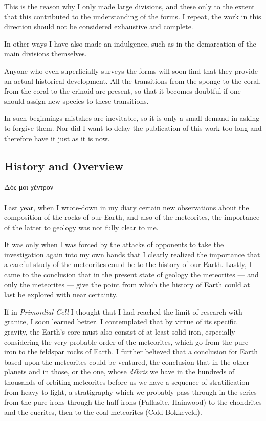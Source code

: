 \documentclass[a4paper, 12pt, oneside]{article}
\begin{document}
This is the reason why I only made large divisions, and these only to the extent that this contributed to the understanding of the forms. I repeat, the work in this direction should not be considered exhaustive and complete.

In other ways I have also made an indulgence, such as in the demarcation of the main divisions themselves.

Anyone who even superficially surveys the forms will soon find that they provide an actual historical development. All the transitions from the sponge to the coral, from the coral to the crinoid are present, so that it becomes doubtful if one should assign new species to these transitions.

In such beginnings mistakes are inevitable, so it is only a small demand in asking to forgive them. Nor did I want to delay the publication of this work too long and therefore have it just as it is now.
\clearpage
\subsection{History and Overview}
Δός μοι χέντρον%
\paragraph*{}
Last year, when I wrote-down in my diary certain new observations about the composition of the rocks of our Earth, and also of the meteorites, the importance of the latter to geology was not fully clear to me.

It was only when I was forced by the attacks of opponents to take the investigation again into my own hands that I clearly realized the importance that a careful study of the meteorites could be to the history of our Earth. Lastly, I came to the conclusion that in the present state of geology the meteorites --- and only the meteorites --- give the point from which the history of Earth could at last be explored with near certainty.

If in \emph{Primordial Cell} I thought that I had reached the limit of research with granite, I soon learned better. I contemplated that by virtue of its specific gravity, the Earth's core must also consist of at least solid iron, especially considering the very probable order of the meteorites, which go from the pure iron to the feldspar rocks of Earth. I further believed that a conclusion for Earth based upon the meteorites could be ventured, the conclusion that in the other planets and in those, or the one, whose \emph{débris} we have in the hundreds of thousands of orbiting meteorites before us we have a sequence of stratification from heavy to light, a stratigraphy which we probably pass through in the series from the pure-irons through the half-irons (Pallasite, Hainwood) to the chondrites and the eucrites, then to the coal meteorites (Cold Bokkeveld).
\end{document}
